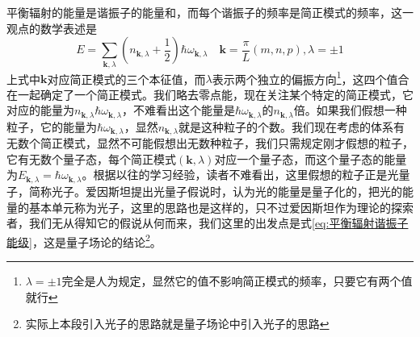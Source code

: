 \documentclass[../../main.tex]{subfiles}
\begin{document}
平衡辐射的能量是谐振子的能量和，而每个谐振子的频率是简正模式的频率，这一观点的数学表述是
\begin{equation}\label{eq:平衡辐射谐振子能级}
E=\sum_{\bm{k},\lambda}\left(n_{\bm{k},\lambda}+\frac{1}{2}\right)\hbar\omega_{\bm{k},\lambda}\quad \bm{k}=\frac{\pi}{L}(m,n,p),\lambda=\pm1
\end{equation}
上式中\(\bm{k}\)对应简正模式的三个本征值，而\(\lambda\)表示两个独立的偏振方向\footnote{\(\lambda=\pm1\)完全是人为规定，显然它的值不影响简正模式的频率，只要它有两个值就行}，这四个值合在一起确定了一个简正模式。我们略去零点能，现在关注某个特定的简正模式，它对应的能量为\(n_{\bm{k},\lambda}\hbar\omega_{\bm{k},\lambda}\)，不难看出这个能量是\(\hbar\omega_{\bm{k},\lambda}\)的\(n_{\bm{k},\lambda}\)倍。如果我们假想一种粒子，它的能量为\(\hbar\omega_{\bm{k},\lambda}\)，显然\(n_{\bm{k},\lambda}\)就是这种粒子的个数。我们现在考虑的体系有无数个简正模式，显然不可能假想出无数种粒子，我们只需规定刚才假想的粒子，它有无数个量子态，每个简正模式\((\bm{k},\lambda)\)对应一个量子态，而这个量子态的能量为\(E_{\bm{k},\lambda}=\hbar\omega_{\bm{k},\lambda}\)。根据以往的学习经验，读者不难看出，这里假想的粒子正是光量子，简称光子。爱因斯坦提出光量子假说时，认为光的能量是量子化的，把光的能量的基本单元称为光子，这里的思路也是这样的，只不过爱因斯坦作为理论的探索者，我们无从得知它的假说从何而来，我们这里的出发点是式\eqref{eq:平衡辐射谐振子能级}，这是量子场论的结论\footnote{实际上本段引入光子的思路就是量子场论中引入光子的思路}。
\end{document}
